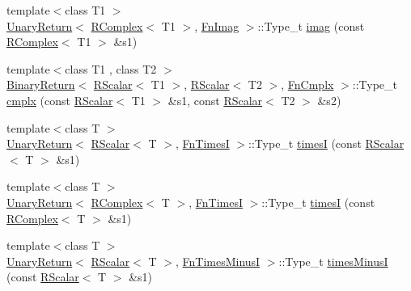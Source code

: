 \begin{DoxyCompactItemize}
\item 
{\footnotesize template$<$class T1 $>$ }\\\mbox{\hyperlink{structENSEM_1_1UnaryReturn}{Unary\+Return}}$<$ \mbox{\hyperlink{classENSEM_1_1RComplex}{R\+Complex}}$<$ T1 $>$, \mbox{\hyperlink{structENSEM_1_1FnImag}{Fn\+Imag}} $>$\+::Type\+\_\+t \mbox{\hyperlink{group__rcomplex_ga983adfaddb65779a64c1a6d201bea704}{imag}} (const \mbox{\hyperlink{classENSEM_1_1RComplex}{R\+Complex}}$<$ T1 $>$ \&s1)
\item 
{\footnotesize template$<$class T1 , class T2 $>$ }\\\mbox{\hyperlink{structENSEM_1_1BinaryReturn}{Binary\+Return}}$<$ \mbox{\hyperlink{classENSEM_1_1RScalar}{R\+Scalar}}$<$ T1 $>$, \mbox{\hyperlink{classENSEM_1_1RScalar}{R\+Scalar}}$<$ T2 $>$, \mbox{\hyperlink{structENSEM_1_1FnCmplx}{Fn\+Cmplx}} $>$\+::Type\+\_\+t \mbox{\hyperlink{group__rcomplex_gae6f982df6dd1eba378ad74676dc96bba}{cmplx}} (const \mbox{\hyperlink{classENSEM_1_1RScalar}{R\+Scalar}}$<$ T1 $>$ \&s1, const \mbox{\hyperlink{classENSEM_1_1RScalar}{R\+Scalar}}$<$ T2 $>$ \&s2)
\item 
{\footnotesize template$<$class T $>$ }\\\mbox{\hyperlink{structENSEM_1_1UnaryReturn}{Unary\+Return}}$<$ \mbox{\hyperlink{classENSEM_1_1RScalar}{R\+Scalar}}$<$ T $>$, \mbox{\hyperlink{structENSEM_1_1FnTimesI}{Fn\+TimesI}} $>$\+::Type\+\_\+t \mbox{\hyperlink{group__rcomplex_ga1741ab434937b21a3f54881161f429aa}{timesI}} (const \mbox{\hyperlink{classENSEM_1_1RScalar}{R\+Scalar}}$<$ T $>$ \&s1)
\item 
{\footnotesize template$<$class T $>$ }\\\mbox{\hyperlink{structENSEM_1_1UnaryReturn}{Unary\+Return}}$<$ \mbox{\hyperlink{classENSEM_1_1RComplex}{R\+Complex}}$<$ T $>$, \mbox{\hyperlink{structENSEM_1_1FnTimesI}{Fn\+TimesI}} $>$\+::Type\+\_\+t \mbox{\hyperlink{group__rcomplex_gaf442aefeacd8aece996f6a9d9028d72e}{timesI}} (const \mbox{\hyperlink{classENSEM_1_1RComplex}{R\+Complex}}$<$ T $>$ \&s1)
\item 
{\footnotesize template$<$class T $>$ }\\\mbox{\hyperlink{structENSEM_1_1UnaryReturn}{Unary\+Return}}$<$ \mbox{\hyperlink{classENSEM_1_1RScalar}{R\+Scalar}}$<$ T $>$, \mbox{\hyperlink{structENSEM_1_1FnTimesMinusI}{Fn\+Times\+MinusI}} $>$\+::Type\+\_\+t \mbox{\hyperlink{group__rcomplex_gaf58bc5b02a5a7fed1251f5ad0f33325a}{times\+MinusI}} (const \mbox{\hyperlink{classENSEM_1_1RScalar}{R\+Scalar}}$<$ T $>$ \&s1)
\item 

\end{DoxyCompactItemize}
